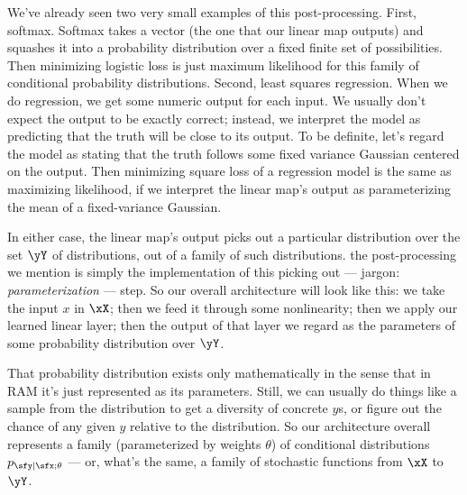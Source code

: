 We've already seen two very small examples of this post-processing.  First,
softmax.  Softmax takes a vector (the one that our linear map outputs) and
squashes it into a probability distribution over a fixed finite set of
possibilities.  Then minimizing logistic loss is just maximum likelihood for
this family of conditional probability distributions.  Second, least squares
regression.  When we do regression, we get some numeric output for each input.
We usually don't expect the output to be exactly correct; instead, we interpret
the model as predicting that the truth will be close to its output.  To be
definite, let's regard the model as stating that the truth follows some fixed
variance Gaussian centered on the output.  Then minimizing square loss of a
regression model is the same as maximizing likelihood, if we interpret the
linear map's output as parameterizing the mean of a fixed-variance Gaussian.

In either case, the linear map's output picks out a particular distribution
over the set $\yY$ of distributions, out of a family of such distributions.
the post-processing we mention is simply the implementation of this picking out
--- jargon: \emph{parameterization} --- step.  So our overall architecture will
look like this: we take the input $x$ in $\xX$; then we feed it through some
nonlinearity; then we apply our learned linear layer; then the output of that
layer we regard as the parameters of some probability distribution over $\yY$.

That probability distribution exists only mathematically in the sense that in
RAM it's just represented as its parameters.  Still, we can usually do things
like a sample from the distribution to get a diversity of concrete $y$s, or
figure out the chance of any given $y$ relative to the distribution.  So our
architecture overall represents a family (parameterized by weights $\theta$) of
conditional distributions $p_{\sfy|\sfx;\theta}$ --- or, what's the same, a
family of stochastic functions from $\xX$ to $\yY$.

